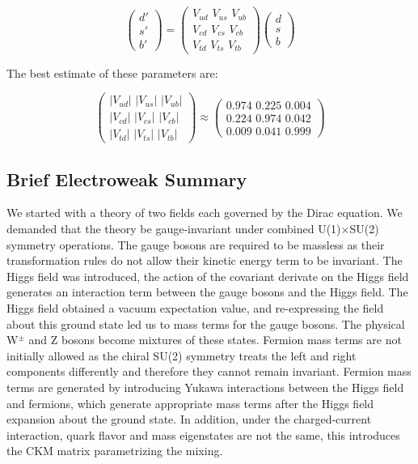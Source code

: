 \begin{equation}
\label{eq:ckmv}
\begin{pmatrix} d' \\ s' \\ b' \end{pmatrix} =
\begin{pmatrix} V_{ud} \,\, V_{us}  \,\, V_{ub} \\ V_{cd} \,\, V_{cs} \,\, V_{cb}  \\ V_{td} \,\, V_{ts} \,\, V_{tb} \end{pmatrix}
\begin{pmatrix} d \\ s \\ b \end{pmatrix}
\end{equation}

The best estimate of these parameters \cite{ckm} are:

\begin{equation}
\label{eq:ckmval}
\begin{pmatrix} |V_{ud}| \,\, |V_{us}|  \,\, |V_{ub}| \\ |V_{cd}| \,\, |V_{cs}| \,\, |V_{cb}|  \\ |V_{td}| \,\, |V_{ts}| \,\, |V_{tb}| \end{pmatrix} \approx
\begin{pmatrix} 0.974 \,\, 0.225  \,\, 0.004 \\ 0.224 \,\, 0.974 \,\, 0.042  \\ 0.009 \,\, 0.041 \,\, 0.999 \end{pmatrix}
\end{equation}

\subsection{Brief Electroweak Summary}

We started with a theory of two fields each governed by the Dirac equation. We demanded that the theory be gauge-invariant under combined U(1)$\times$SU(2) symmetry operations. The gauge bosons are required to be massless as their transformation rules do not allow their kinetic energy term to be invariant. The Higgs field was introduced, the action of the covariant derivate on the Higgs field generates an interaction term between the gauge bosons and the Higgs field. The Higgs field obtained a vacuum expectation value, and re-expressing the field about this ground state led us to mass terms for the gauge bosons. The physical W$^{\pm}$ and Z bosons become mixtures of these states. Fermion mass terms are not initially allowed as the chiral SU(2) symmetry treats the left and right components differently and therefore they cannot remain invariant. Fermion mass terms are generated by introducing Yukawa interactions between the Higgs field and fermions, which generate appropriate mass terms after the Higgs field expansion about the ground state. In addition, under the charged-current interaction, quark flavor and mass eigenstates are not the same, this introduces the CKM matrix parametrizing the mixing.

